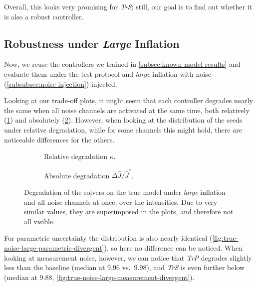 Overall, this looks very promising for \emph{TrS}; still, our goal is to find out whether it is also a robust controller.

\subsection{Robustness under \emph{Large} Inflation}
\label{subsec:true-model-noise}

Now, we reuse the controllers we trained in \cref{subsec:known-model-results} and evaluate them under the test protocol
and \emph{large} inflation with noise (\cref{subsubsec:noise-injection}) injected.

Looking at our trade-off plots, it might seem that each controller degrades nearly the same when all noise channels are activated at the same time,
both relatively (\cref{fig:true-noise-large-all-relative}) and absolutely (\cref{fig:true-noise-large-all-absolute}). However,
when looking at the distribution of the seeds under relative degradation, while for some channels this might hold, there
are noticeable differences for the others.

\begin{figure}[htbp]
  \centering
  \begin{subfigure}[t]{0.49\linewidth}
    \centering
    \caption{Relative degradation $\kappa$.}
    \label{fig:true-noise-large-all-relative}
  \end{subfigure}\hfill
  \begin{subfigure}[t]{0.49\linewidth}
    \centering
    \caption{Absolute degradation $\Delta \hat{J} / \hat{J}^{*}$.}
    \label{fig:true-noise-large-all-absolute}
  \end{subfigure}
  \caption{Degradation of the solvers on the true model under \emph{large} inflation and all noise channels at once,
  over the intensities. Due to very similar values, they are superimposed in the plots, and therefore not all visible.}
  \label{fig:true-noise-large-all}
\end{figure}

For parametric uncertainty the distribution is also nearly identical (\cref{fig:true-noise-large-parametric-divergent}), so here no difference can be noticed. When looking
at measurement noise, however, we can notice that \emph{TrP} degrades slightly less than the baseline (median at $9.96$ vs.\ $9.98$),
and \emph{TrS} is even further below (median at $9.88$, \cref{fig:true-noise-large-measurement-divergent}).

